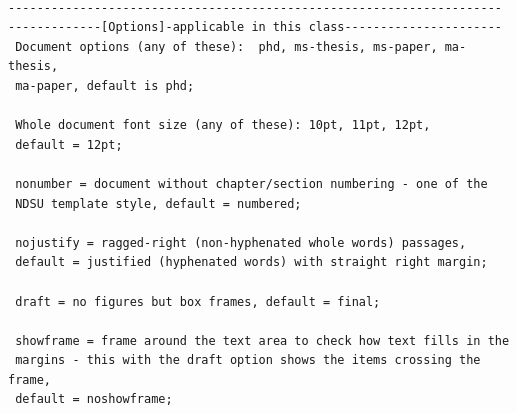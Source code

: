 \documentclass[phd]{ndsu-thesis-2022}
\begin{document}
\begin{lstlisting}[basicstyle=\ttfamily\footnotesize\color{blue}] %or \small or \footnotesize etc.

---------------------------------------------------------------------
-------------[Options]-applicable in this class----------------------
 Document options (any of these):  phd, ms-thesis, ms-paper, ma-thesis, 
 ma-paper, default is phd; 
 
 Whole document font size (any of these): 10pt, 11pt, 12pt, 
 default = 12pt; 
 
 nonumber = document without chapter/section numbering - one of the 
 NDSU template style, default = numbered; 
 
 nojustify = ragged-right (non-hyphenated whole words) passages, 
 default = justified (hyphenated words) with straight right margin; 
 
 draft = no figures but box frames, default = final; 
 
 showframe = frame around the text area to check how text fills in the 
 margins - this with the draft option shows the items crossing the frame, 
 default = noshowframe; 
 

\end{lstlisting}
\end{document}
